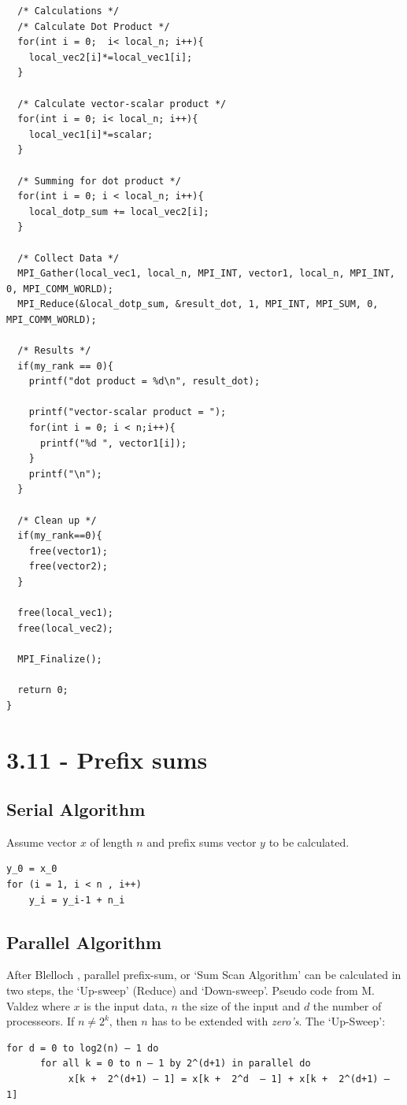\documentclass[a4paper,11pt,twoside]{article}
\begin{document}
\begin{verbatim}
  /* Calculations */
  /* Calculate Dot Product */
  for(int i = 0;  i< local_n; i++){
    local_vec2[i]*=local_vec1[i];
  }

  /* Calculate vector-scalar product */
  for(int i = 0; i< local_n; i++){
    local_vec1[i]*=scalar;
  }

  /* Summing for dot product */
  for(int i = 0; i < local_n; i++){
    local_dotp_sum += local_vec2[i];    
  } 
 
  /* Collect Data */
  MPI_Gather(local_vec1, local_n, MPI_INT, vector1, local_n, MPI_INT, 0, MPI_COMM_WORLD);
  MPI_Reduce(&local_dotp_sum, &result_dot, 1, MPI_INT, MPI_SUM, 0, MPI_COMM_WORLD);

  /* Results */
  if(my_rank == 0){
    printf("dot product = %d\n", result_dot);

    printf("vector-scalar product = ");
    for(int i = 0; i < n;i++){
      printf("%d ", vector1[i]);
    }
    printf("\n");
  }

  /* Clean up */
  if(my_rank==0){
    free(vector1);
    free(vector2);
  }
  
  free(local_vec1);
  free(local_vec2);

  MPI_Finalize();

  return 0;
} 
\end{verbatim}

\section{3.11 - Prefix sums}
\subsection*{Serial Algorithm}
Assume vector $x$ of length $n$ and prefix sums vector $y$ to be calculated.
\begin{verbatim}
y_0 = x_0
for (i = 1, i < n , i++)
    y_i = y_i-1 + n_i
\end{verbatim}

\subsection*{Parallel Algorithm}
After Blelloch \cite{belloch1990}, parallel prefix-sum, or `Sum Scan Algorithm' can be calculated in two steps, the `Up-sweep' (Reduce) and `Down-sweep'. Pseudo code from M. Valdez \cite{valdez2012} where $x$ is the input data, $n$ the size of the input and $d$ the number of processeors. If $n \neq 2^{k}$, then $n$ has to be extended with \textit{zero's}. The `Up-Sweep':
\begin{verbatim}
for d = 0 to log2(n) – 1 do 
      for all k = 0 to n – 1 by 2^(d+1) in parallel do 
           x[k +  2^(d+1) – 1] = x[k +  2^d  – 1] + x[k +  2^(d+1) – 1]
\end{verbatim}
\end{document}
